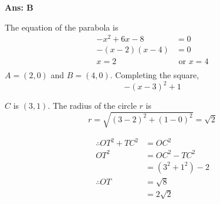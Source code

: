\documentclass[border=3pt,varwidth=70mm]{standalone}
\begin{document}
\begin{answer}
\hrulefill\par
\textbf{Ans: B}

The equation of the parabola is 
\begin{equation*}
\begin{aligned}
-x^2 + 6x - 8 &= 0 \\
-(x-2)(x-4) &= 0 \\
x = 2 &\text{ or } x = 4 \\
\end{aligned}
\end{equation*}
$A=(2,0)$ and $B=(4,0)$. Completing the square, $$-(x-3)^2 + 1$$

$C$ is $(3,1)$. The radius of the circle $r$ is $$r = \sqrt{(3-2)^2+(1-0)^2}=\sqrt{2}$$

\begin{equation*}
\begin{aligned}
\therefore OT^2 + TC^2 &= OC^2 \\
OT^2 &= OC^2 - TC^2 \\
	 &= (3^2+1^2) - 2 \\
\therefore OT &= \sqrt{8} \\
			  &= 2\sqrt{2} \\
\end{aligned}
\end{equation*}

\end{answer}
\end{document}
